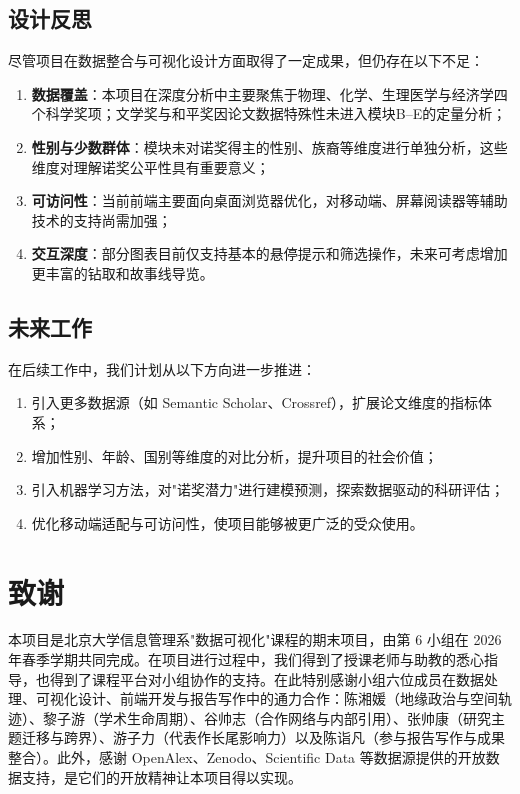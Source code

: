 \documentclass[UTF8]{CjC}
\theoremstyle{mystyle}
\begin{document}
\subsection{设计反思}
尽管项目在数据整合与可视化设计方面取得了一定成果，但仍存在以下不足：
\begin{enumerate}
    \item \textbf{数据覆盖}：本项目在深度分析中主要聚焦于物理、化学、生理医学与经济学四个科学奖项；文学奖与和平奖因论文数据特殊性未进入模块B–E的定量分析；
    \item \textbf{性别与少数群体}：模块未对诺奖得主的性别、族裔等维度进行单独分析，这些维度对理解诺奖公平性具有重要意义；
    \item \textbf{可访问性}：当前前端主要面向桌面浏览器优化，对移动端、屏幕阅读器等辅助技术的支持尚需加强；
    \item \textbf{交互深度}：部分图表目前仅支持基本的悬停提示和筛选操作，未来可考虑增加更丰富的钻取和故事线导览。
\end{enumerate}

\subsection{未来工作}
在后续工作中，我们计划从以下方向进一步推进：
\begin{enumerate}
    \item 引入更多数据源（如 Semantic Scholar、Crossref），扩展论文维度的指标体系；
    \item 增加性别、年龄、国别等维度的对比分析，提升项目的社会价值；
    \item 引入机器学习方法，对"诺奖潜力"进行建模预测，探索数据驱动的科研评估；
    \item 优化移动端适配与可访问性，使项目能够被更广泛的受众使用。
\end{enumerate}

\section{致谢}
本项目是北京大学信息管理系"数据可视化"课程的期末项目，由第 6 小组在 2026 年春季学期共同完成。在项目进行过程中，我们得到了授课老师与助教的悉心指导，也得到了课程平台对小组协作的支持。在此特别感谢小组六位成员在数据处理、可视化设计、前端开发与报告写作中的通力合作：陈湘媛（地缘政治与空间轨迹）、黎子游（学术生命周期）、谷帅志（合作网络与内部引用）、张帅康（研究主题迁移与跨界）、游子力（代表作长尾影响力）以及陈诣凡（参与报告写作与成果整合）。此外，感谢 OpenAlex、Zenodo、Scientific Data 等数据源提供的开放数据支持，是它们的开放精神让本项目得以实现。
\end{document}
